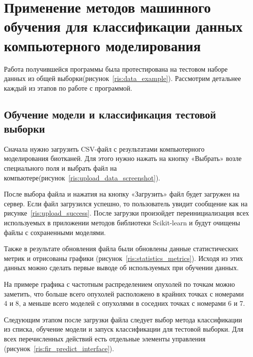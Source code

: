 \newpage
\section{\Large Применение методов машинного обучения для классификации данных компьютерного моделирования}
Работа получившейся программы была протестирована на тестовом наборе данных из общей выборки(рисунок~\ref{ris:data_example}). Рассмотрим детальнее каждый из этапов по работе с программой.

\subsection{Обучение модели и классификация тестовой выборки}
Сначала нужно загрузить CSV-файл с результатами компьютерного моделирования биотканей. Для этого нужно нажать на кнопку «Выбрать» возле специального поля и выбрать файл на компьютере(рисунок~\ref{ris:upload_data_screenshot}).
\par
После выбора файла и нажатия на кнопку «Загрузить» файл будет загружен на сервер. Если файл загрузился успешно, то пользователь увидит сообщение как на рисунке~\ref{ris:upload_success}. После загрузки произойдет переинициализация всех используемых в приложении методов библиотеки Scikit-learn и будут очищены файлы с сохраненными моделями.
\par
Также в результате обновления файла были обновлены данные статистических метрик и отрисованы графики (рисунок~\ref{ris:statistics_metrics}). Исходя из этих данных можно сделать первые выводе об используемых при обучении данных. 
\par
На примере графика с частотным распределением опухолей по точкам можно заметить, что больше всего опухолей расположено в крайних точках с номерами 4 и 8, а меньше всего моделей с опухолями в соседних точках с номерами 6 и 7.
\par
Следующим этапом после загрузки файла следует выбор метода классификации из списка, обучение модели и запуск классификации для тестовой выборки. Для всех перечисленных действий есть отдельные элементы управления (рисунок~\ref{ris:fir_predict_interface}). 


